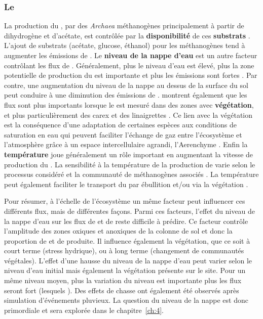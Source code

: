 \subsubsection{Le \chh}

La production du \chh, par des \textit{Archaea} méthanogènes principalement à partir de dihydrogène et d'acétate, est contrôlée par la \textbf{disponibilité} de ces \textbf{substrats} \citep{segers1998}.
L'ajout de substrats (acétate, glucose, éthanol) pour les méthanogènes tend à augmenter les émissions de \chh \citep{coles2002}.
Le \textbf{niveau de la nappe d'eau} est un autre facteur contrôlant les flux de \chh.
Généralement, plus le niveau d'eau est élevé, plus la zone potentielle de production du \chh est importante et plus les émissions sont fortes \citep{pelletier2007}.
Par contre, une augmentation du niveau de la nappe au dessus de la surface du sol peut conduire à une diminution des émissions de \chh \citep{bubier1995}.
\citet{pelletier2007} montrent également que les flux sont plus importants lorsque le \chh est mesuré dans des zones avec \textbf{végétation}, et plus particulièrement des carex et des linaigrettes \citep{gogo2011}.
Ce lien avec la végétation est la conséquence d'une adaptation de certaines espèces aux conditions de saturation en eau qui peuvent faciliter l'échange de gaz entre l'écosystème et l'atmosphère grâce à un espace intercellulaire agrandi, l'Aerenchyme \citep{rydin2013d}.
Enfin la \textbf{température} joue généralement un rôle important en augmentant la vitesse de production du \chh.
La sensibilité à la température de la production de \chh varie selon le processus considéré et la communauté de méthanogènes associés \citep{segers1998}.
La température peut également faciliter le transport du \chh par ébullition et/ou via la végétation \citep{lai2009}.

Pour résumer, à l'échelle de l'écosystème un même facteur peut influencer ces différents flux, mais de différentes façons.
Parmi ces facteurs, l'effet du niveau de la nappe d'eau sur les flux de \coo et de \chh reste difficile à prédire.
Ce facteur contrôle l'amplitude des zones oxiques et anoxiques de la colonne de sol et donc la proportion de \coo et de \chh produite.
Il influence également la végétation, que ce soit à court terme (stress hydrique), ou à long terme (changement de communautés végétales).
L'effet d'une hausse du niveau de la nappe d'eau peut varier selon le niveau d'eau initial mais également la végétation présente sur le site.
Pour un même niveau moyen, plus la variation du niveau est importante plus les flux seront fort (lesquels \plop).
Des effets de chasse ont également été observés après simulation d’événements pluvieux.
La question du niveau de la nappe est donc primordiale et sera explorée dans le chapitre~\ref{ch:4}.


